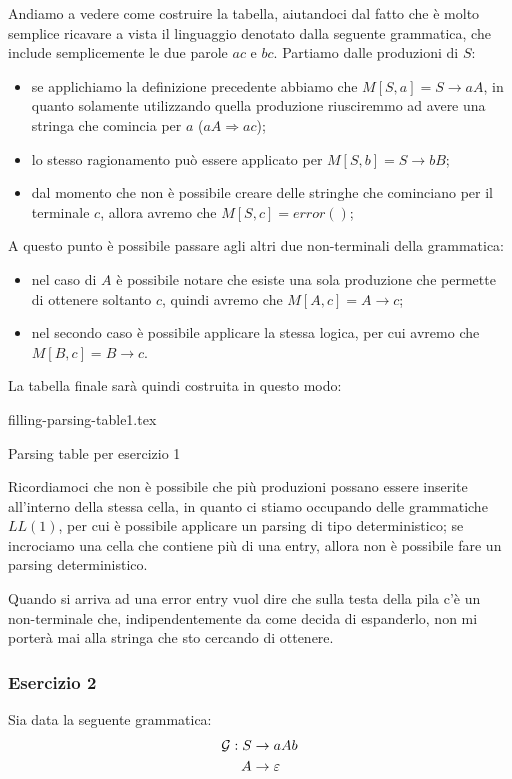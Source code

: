 \documentclass[class=book, crop=false, oneside, 12pt]{standalone}
\begin{document}
Andiamo a vedere come costruire la tabella, aiutandoci dal fatto che è molto semplice ricavare a vista il linguaggio denotato dalla seguente grammatica, che include semplicemente le due parole \(ac\) e \(bc\). Partiamo dalle produzioni di \(S\):
\begin{itemize}
    \item se applichiamo la definizione precedente abbiamo che \(M[S, a] = S \rightarrow aA\), in quanto solamente utilizzando quella produzione riusciremmo ad avere una stringa che comincia per \(a\) (\(aA \Rightarrow ac\));
    \item lo stesso ragionamento può essere applicato per \(M[S, b] = S \rightarrow bB\);
    \item dal momento che non è possibile creare delle stringhe che cominciano per il terminale \(c\), allora avremo che \(M[S, c] = error()\);
\end{itemize}
A questo punto è possibile passare agli altri due non-terminali della grammatica: 
\begin{itemize}
    \item nel caso di \(A\) è possibile notare che esiste una sola produzione che permette di ottenere soltanto \(c\), quindi avremo che \(M[A, c] = A \rightarrow c\);
    \item nel secondo caso è possibile applicare la stessa logica, per cui avremo che \(M[B, c] = B \to c\).
\end{itemize} 
La tabella finale sarà quindi costruita in questo modo:
\begin{table}[H]
	\centering
	{filling-parsing-table1.tex}
    \caption{Parsing table per esercizio 1}
    \label{filling-parsing-table1}
\end{table} 
Ricordiamoci che non è possibile che più produzioni possano essere inserite all'interno della stessa cella, in quanto ci stiamo occupando delle grammatiche \(LL(1)\), per cui è possibile applicare un parsing di tipo deterministico; se incrociamo una cella che contiene più di una entry, allora non è possibile fare un parsing deterministico.

Quando si arriva ad una error entry vuol dire che sulla testa della pila c'è un non-terminale che, indipendentemente da come decida di espanderlo, non mi porterà mai alla stringa che sto cercando di ottenere. 

\subsubsection{Esercizio 2}
Sia data la seguente grammatica:
\begin{align*}
    \mathcal{G}: S &\rightarrow aAb \\
    A &\rightarrow \varepsilon
\end{align*}
\end{document}
